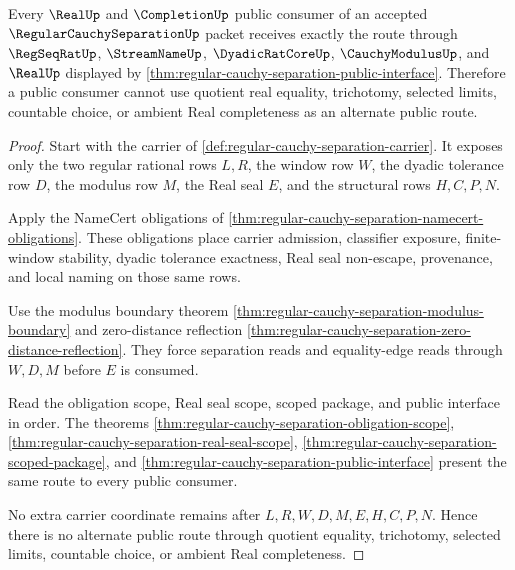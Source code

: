 \begin{theorem}
\label{thm:regular-cauchy-separation-public-route-closure}
Every $\RealUp$ and $\CompletionUp$ public consumer of an accepted $\RegularCauchySeparationUp$ packet receives exactly the route through $\RegSeqRatUp$, $\StreamNameUp$, $\DyadicRatCoreUp$, $\CauchyModulusUp$, and $\RealUp$ displayed by \autoref{thm:regular-cauchy-separation-public-interface}. Therefore a public consumer cannot use quotient real equality, trichotomy, selected limits, countable choice, or ambient Real completeness as an alternate public route.
\end{theorem}
\begin{proof}
Start with the carrier of \autoref{def:regular-cauchy-separation-carrier}. It exposes only the two regular rational rows $L,R$, the window row $W$, the dyadic tolerance row $D$, the modulus row $M$, the Real seal $E$, and the structural rows $H,C,P,N$.

Apply the NameCert obligations of \autoref{thm:regular-cauchy-separation-namecert-obligations}. These obligations place carrier admission, classifier exposure, finite-window stability, dyadic tolerance exactness, Real seal non-escape, provenance, and local naming on those same rows.

Use the modulus boundary theorem \autoref{thm:regular-cauchy-separation-modulus-boundary} and zero-distance reflection \autoref{thm:regular-cauchy-separation-zero-distance-reflection}. They force separation reads and equality-edge reads through $W,D,M$ before $E$ is consumed.

Read the obligation scope, Real seal scope, scoped package, and public interface in order. The theorems \autoref{thm:regular-cauchy-separation-obligation-scope}, \autoref{thm:regular-cauchy-separation-real-seal-scope}, \autoref{thm:regular-cauchy-separation-scoped-package}, and \autoref{thm:regular-cauchy-separation-public-interface} present the same route to every public consumer.

No extra carrier coordinate remains after $L,R,W,D,M,E,H,C,P,N$. Hence there is no alternate public route through quotient equality, trichotomy, selected limits, countable choice, or ambient Real completeness.
\end{proof}

